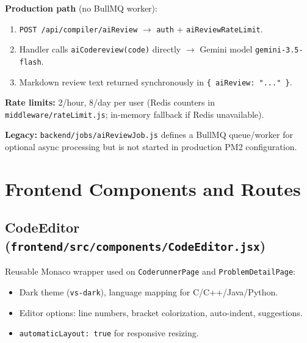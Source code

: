\documentclass[11pt,a4paper]{article}
\begin{document}
\textbf{Production path} (no BullMQ worker):
\begin{enumerate}[noitemsep]
  \item \texttt{POST /api/compiler/aiReview} $\rightarrow$ \texttt{auth} + \texttt{aiReviewRateLimit}.
  \item Handler calls \texttt{aiCodereview(code)} directly $\rightarrow$ Gemini model \texttt{gemini-3.5-flash}.
  \item Markdown review text returned synchronously in \texttt{\{ aiReview: "..." \}}.
\end{enumerate}

\textbf{Rate limits:} 2/hour, 8/day per user (Redis counters in \texttt{middleware/rateLimit.js}; in-memory fallback if Redis unavailable).

\textbf{Legacy:} \texttt{backend/jobs/aiReviewJob.js} defines a BullMQ queue/worker for optional async processing but is not started in production PM2 configuration.

\section{Frontend Components and Routes}

\subsection{CodeEditor (\texttt{frontend/src/components/CodeEditor.jsx})}
Reusable Monaco wrapper used on \texttt{CoderunnerPage} and \texttt{ProblemDetailPage}:
\begin{itemize}[noitemsep]
  \item Dark theme (\texttt{vs-dark}), language mapping for C/C++/Java/Python.
  \item Editor options: line numbers, bracket colorization, auto-indent, suggestions.
  \item \texttt{automaticLayout: true} for responsive resizing.
\end{itemize}
\end{document}
